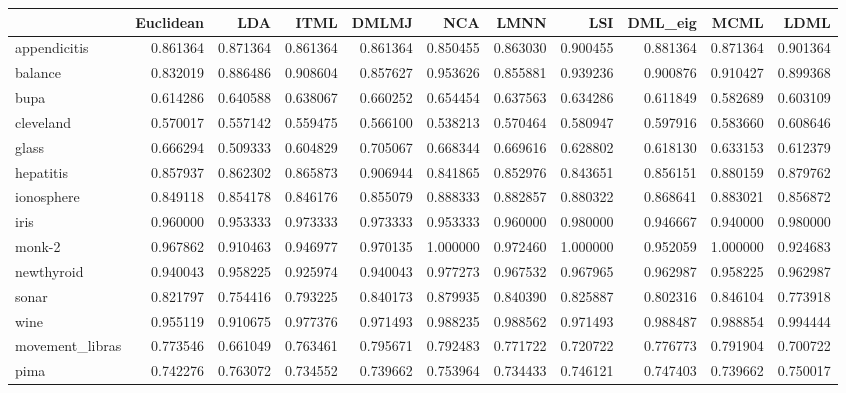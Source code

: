 \begin{tabular}{lrrrrrrrrrr}
\toprule
{} &  Euclidean &       LDA &      ITML &     DMLMJ &       NCA &      LMNN &       LSI &   DML\_eig &      MCML &      LDML \\
\midrule
appendicitis    &   0.861364 &  0.871364 &  0.861364 &  0.861364 &  0.850455 &  0.863030 &  0.900455 &  0.881364 &  0.871364 &  0.901364 \\
balance         &   0.832019 &  0.886486 &  0.908604 &  0.857627 &  0.953626 &  0.855881 &  0.939236 &  0.900876 &  0.910427 &  0.899368 \\
bupa            &   0.614286 &  0.640588 &  0.638067 &  0.660252 &  0.654454 &  0.637563 &  0.634286 &  0.611849 &  0.582689 &  0.603109 \\
cleveland       &   0.570017 &  0.557142 &  0.559475 &  0.566100 &  0.538213 &  0.570464 &  0.580947 &  0.597916 &  0.583660 &  0.608646 \\
glass           &   0.666294 &  0.509333 &  0.604829 &  0.705067 &  0.668344 &  0.669616 &  0.628802 &  0.618130 &  0.633153 &  0.612379 \\
hepatitis       &   0.857937 &  0.862302 &  0.865873 &  0.906944 &  0.841865 &  0.852976 &  0.843651 &  0.856151 &  0.880159 &  0.879762 \\
ionosphere      &   0.849118 &  0.854178 &  0.846176 &  0.855079 &  0.888333 &  0.882857 &  0.880322 &  0.868641 &  0.883021 &  0.856872 \\
iris            &   0.960000 &  0.953333 &  0.973333 &  0.973333 &  0.953333 &  0.960000 &  0.980000 &  0.946667 &  0.940000 &  0.980000 \\
monk-2          &   0.967862 &  0.910463 &  0.946977 &  0.970135 &  1.000000 &  0.972460 &  1.000000 &  0.952059 &  1.000000 &  0.924683 \\
newthyroid      &   0.940043 &  0.958225 &  0.925974 &  0.940043 &  0.977273 &  0.967532 &  0.967965 &  0.962987 &  0.958225 &  0.962987 \\
sonar           &   0.821797 &  0.754416 &  0.793225 &  0.840173 &  0.879935 &  0.840390 &  0.825887 &  0.802316 &  0.846104 &  0.773918 \\
wine            &   0.955119 &  0.910675 &  0.977376 &  0.971493 &  0.988235 &  0.988562 &  0.971493 &  0.988487 &  0.988854 &  0.994444 \\
movement\_libras &   0.773546 &  0.661049 &  0.763461 &  0.795671 &  0.792483 &  0.771722 &  0.720722 &  0.776773 &  0.791904 &  0.700722 \\
pima            &   0.742276 &  0.763072 &  0.734552 &  0.739662 &  0.753964 &  0.734433 &  0.746121 &  0.747403 &  0.739662 &  0.750017 \\

\end{tabular}
